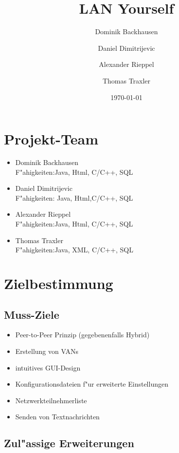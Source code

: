 \documentclass[a4paper,12pt]{scrreprt}
\begin{document}
\author{Dominik Backhausen \and Daniel Dimitrijevic \and Alexander Rieppel \and Thomas Traxler}
\subject{Pflichtenheft}
\title{LAN Yourself}
\date{\today}
\maketitle
\tableofcontents

\chapter{Projekt-Team}
	\begin{itemize}
	\item Dominik Backhausen\\
	F"ahigkeiten:Java, Html, C/C++, SQL
	\item Daniel Dimitrijevic\\
	F"ahigkeiten: Java, Html,C/C++, SQL
	\item Alexander Rieppel\\
		F"ahigkeiten:Java, Html, C/C++, SQL    
	\item Thomas Traxler\\
	F"ahigkeiten:Java, XML, C/C++, SQL
	\end{itemize}
	
	
\chapter{Zielbestimmung}
\section{Muss-Ziele}
	\begin{itemize}
	\item Peer-to-Peer Prinzip (gegebenenfalls Hybrid)
	\item Erstellung von VANs
	\item intuitives GUI-Design
	\item Konfigurationsdateien f"ur erweiterte Einstellungen
	\item Netzwerkteilnehmerliste
	\item Senden von Textnachrichten
	\end{itemize}
	
	\section{Zul"assige Erweiterungen}
	
\end{document}
